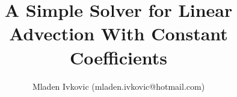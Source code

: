 



\title{A Simple Solver for Linear Advection With Constant Coefficients}
\author{Mladen Ivkovic (mladen.ivkovic@hotmail.com)}
\date{}







\maketitle
\tableofcontents
\newpage

% 






